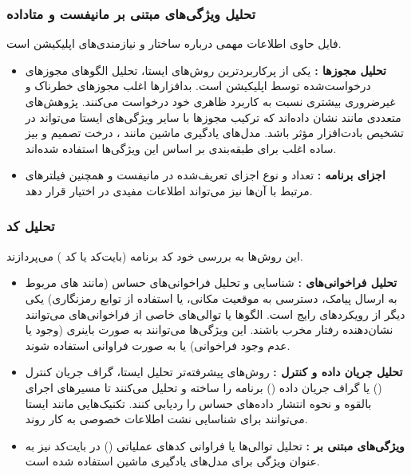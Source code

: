 \subsubsection{تحلیل ویژگی‌های مبتنی بر مانیفست و متاداده}
فایل  حاوی اطلاعات مهمی درباره ساختار و نیازمندی‌های اپلیکیشن است.
\begin{itemize}
    \renewcommand{\labelitemi}{\lr{$\bullet$}}
    \item \textbf{تحلیل مجوزها :} یکی از پرکاربردترین روش‌های ایستا، تحلیل الگوهای مجوزهای درخواست‌شده توسط اپلیکیشن است. بدافزارها اغلب مجوزهای خطرناک و غیرضروری بیشتری نسبت به کاربرد ظاهری خود درخواست می‌کنند. پژوهش‌های متعددی مانند  \cite{Drebin} نشان داده‌اند که ترکیب مجوزها با سایر ویژگی‌های ایستا می‌تواند در تشخیص بادت‌افزار مؤثر باشد. مدل‌های یادگیری ماشین مانند ، درخت تصمیم و بیز ساده اغلب برای طبقه‌بندی بر اساس این ویژگی‌ها استفاده شده‌اند.
    \item \textbf{اجزای برنامه :} تعداد و نوع اجزای تعریف‌شده در مانیفست  و همچنین فیلترهای  مرتبط با آن‌ها نیز می‌تواند اطلاعات مفیدی در اختیار قرار دهد.
\end{itemize}

\subsubsection{تحلیل کد }
این روش‌ها به بررسی خود کد برنامه (بایت‌کد  یا کد ) می‌پردازند.
\begin{itemize}
    \renewcommand{\labelitemi}{\lr{$\bullet$}}
    \item \textbf{تحلیل فراخوانی‌های :} شناسایی و تحلیل فراخوانی‌های  حساس (مانند های مربوط به ارسال پیامک، دسترسی به موقعیت مکانی، یا استفاده از توابع رمزنگاری) یکی دیگر از رویکردهای رایج است. الگوها یا توالی‌های خاصی از فراخوانی‌های  می‌توانند نشان‌دهنده رفتار مخرب باشند. این ویژگی‌ها می‌توانند به صورت باینری (وجود یا عدم وجود فراخوانی) یا به صورت فراوانی استفاده شوند.
    \item \textbf{تحلیل جریان داده و کنترل :} روش‌های پیشرفته‌تر تحلیل ایستا، گراف جریان کنترل () یا گراف جریان داده () برنامه را ساخته و تحلیل می‌کنند تا مسیرهای اجرای بالقوه و نحوه انتشار داده‌های حساس را ردیابی کنند. تکنیک‌هایی مانند  ایستا می‌توانند برای شناسایی نشت اطلاعات خصوصی به کار روند.
    \item \textbf{ویژگی‌های مبتنی بر :} تحلیل توالی‌ها یا فراوانی کدهای عملیاتی () در بایت‌کد نیز به عنوان ویژگی برای مدل‌های یادگیری ماشین استفاده شده است.
\end{itemize}


